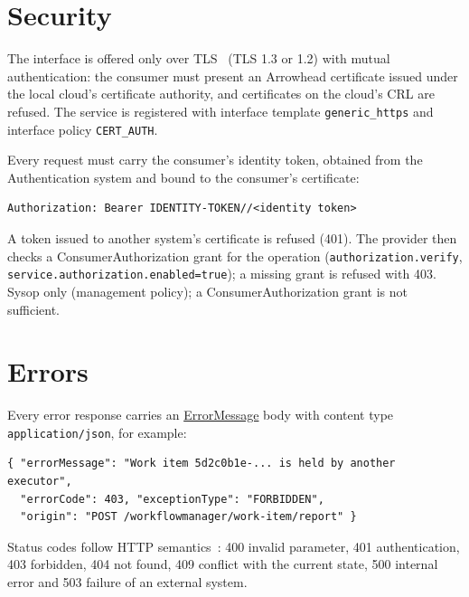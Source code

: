 \documentclass[a4paper]{arrowhead}
\newcommand{\mref}[1]{{\textcolor{ArrowheadPurple}{\hyperref[sec:model:#1]{#1}}}}
\begin{document}
\section{Security}
\label{sec:security}
The interface is offered only over TLS~\cite{rfc8446} (TLS 1.3 or 1.2) with mutual authentication: the consumer must
present an Arrowhead certificate issued under the local cloud's certificate authority, and certificates on the
cloud's CRL are refused. The service is registered with interface template \texttt{generic\_\allowbreak{}https} and interface
policy \texttt{CERT\_AUTH}.

Every request must carry the consumer's identity token, obtained from the Authentication system and bound to the
consumer's certificate:
\begin{lstlisting}
Authorization: Bearer IDENTITY-TOKEN//<identity token>
\end{lstlisting}
A token issued to another system's certificate is refused (401). The provider then checks a ConsumerAuthorization
grant for the operation (\texttt{authorization.\allowbreak{}verify}, \texttt{service.\allowbreak{}authorization.\allowbreak{}enabled=\allowbreak{}true}); a missing grant is
refused with 403. Sysop only (management policy); a ConsumerAuthorization grant is not sufficient.


\section{Errors}
\label{sec:errors}
Every error response carries an \mref{ErrorMessage} body with content type \texttt{application/\allowbreak{}json}, for example:
\begin{lstlisting}
{ "errorMessage": "Work item 5d2c0b1e-... is held by another executor",
  "errorCode": 403, "exceptionType": "FORBIDDEN",
  "origin": "POST /workflowmanager/work-item/report" }
\end{lstlisting}
Status codes follow HTTP semantics~\cite{rfc9110}: 400 invalid parameter, 401 authentication, 403 forbidden, 404 not
found, 409 conflict with the current state, 500 internal error and 503 failure of an external system.
\end{document}
